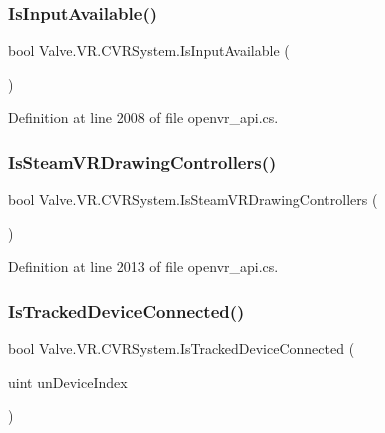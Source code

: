 \subsubsection{\texorpdfstring{IsInputAvailable()}{IsInputAvailable()}}
{\footnotesize\ttfamily bool Valve.\+V\+R.\+C\+V\+R\+System.\+Is\+Input\+Available (\begin{DoxyParamCaption}{ }\end{DoxyParamCaption})}



Definition at line 2008 of file openvr\+\_\+api.\+cs.

\mbox{\label{class_valve_1_1_v_r_1_1_c_v_r_system_a7f9a259b909f4dc21263352a3d122806}} 
\subsubsection{\texorpdfstring{IsSteamVRDrawingControllers()}{IsSteamVRDrawingControllers()}}
{\footnotesize\ttfamily bool Valve.\+V\+R.\+C\+V\+R\+System.\+Is\+Steam\+V\+R\+Drawing\+Controllers (\begin{DoxyParamCaption}{ }\end{DoxyParamCaption})}



Definition at line 2013 of file openvr\+\_\+api.\+cs.

\mbox{\label{class_valve_1_1_v_r_1_1_c_v_r_system_aeba3d5d5d782b1a343ae1555b30c4c3f}} 
\subsubsection{\texorpdfstring{IsTrackedDeviceConnected()}{IsTrackedDeviceConnected()}}
{\footnotesize\ttfamily bool Valve.\+V\+R.\+C\+V\+R\+System.\+Is\+Tracked\+Device\+Connected (\begin{DoxyParamCaption}\item[{uint}]{un\+Device\+Index }\end{DoxyParamCaption})}



